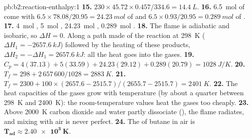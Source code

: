 \begin{solution}{pb:b2:reaction-enthalpy:1}
\textbf{15.} $230 \times 45.72 \times 0.457/334.6 = \qty{14.4}{L}$.
\textbf{16.} \qty{6.5}{mol} of  come with $6.5 \times 78.08/20.95 =
\qty{24.23}{mol}$ of  and $6.5 \times 0.93/20.95 = \qty{0.289}{mol}$
of .
\textbf{17.} \qty{4}{mol} , \qty{5}{mol} ,
\qty{24.23}{mol} , \qty{0.289}{mol} .
\textbf{18.} The flame is adiabatic and isobaric, so $\Delta H = 0$. Along a
path made of the reaction at \qty{298}{K} ($\Delta H_1 =
\qty{-2657.6}{kJ}$) followed by the heating of these products, $\Delta H_2 =
-\Delta H_1 = \qty{+2657.6}{kJ}$: all the heat goes into the gases.
\textbf{19.} $C_p = 4(37.13) + 5(33.59) + 24.23(29.12) + 0.289(20.79) =
\qty{1028}{J/K}$.
\textbf{20.} $T_f = 298 + 2\,657\,600/1028 = \qty{2883}{K}$.
\textbf{21.} $T_f = 2300 + 100 \times (2657.6 - 2515.7)/(2655.7 - 2515.7) =
\qty{2401}{K}$.
\textbf{22.} The heat capacities of the gases grow with temperature (by
about a quarter between \qty{298}{K} and \qty{2400}{K}): the room-temperature
values heat the gases too cheaply.
\textbf{23.} Above \qty{2000}{K} carbon dioxide and water partly dissociate
(), the flame radiates, and mixing with air is never perfect.
\textbf{24.} The  of butane in air is
$\boldsymbol{T_{\text{ad}} \approx \qty{2.40e3}{K}}$.
\end{solution}
